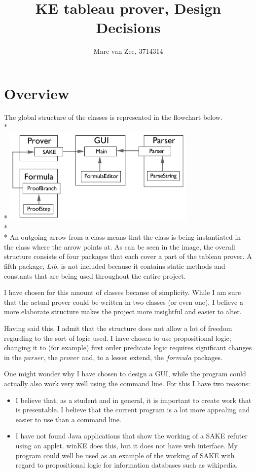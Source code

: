 \documentclass{article}
\title{KE tableau prover, Design Decisions}
\author{Marc van Zee, 3714314}
\begin{document}
 
\maketitle
\section{Overview}
The global structure of the classes is represented in the flowchart below.\\*\\*
\includegraphics[height=180px]{flowchart.jpg}\\*\\*
An outgoing arrow from a class means that the class is being instantiated in the class where the arrow points at. As can be seen in the image, the overall structure consists of four packages that each cover a part of the tableau prover. A fifth package, $Lib$, is not included because it contains static methods and constants that are being used throughout the entire project.

I have chosen for this amount of classes because of simplicity. While I am sure that the actual prover could be written in two classes (or even one), I believe a more elaborate structure makes the project more insightful and easier to alter.

Having said this, I admit that the structure does not allow a lot of freedom regarding to the sort of logic used. I have chosen to use propositional logic; changing it to (for example) first order predicate logic requires significant changes in the $parser$, the $prover$ and, to a lesser extend, the $formula$ packages.

One might wonder why I have chosen to design a GUI, while the program could actually also work very well using the command line. For this I have two reasons:
\begin{itemize}
\item I believe that, as a student and in general, it is important to create work that is presentable. I believe that the current program is a lot more appealing and easier to use than a command line.
\item I have not found Java applications that show the working of a SAKE refuter using an applet. winKE does this, but it does not have web interface. My program could well be used as an example of the working of SAKE with regard to propositional logic for information databases such as wikipedia.
\end{itemize}
\end{document}
